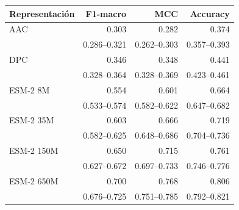 \begingroup\small\setlength{\tabcolsep}{3pt}
\begin{tabular}{lrrr}
\toprule
Representación & F1-macro & MCC & Accuracy \\
\midrule
AAC & 0.303 & 0.282 & 0.374 \\
 & {\scriptsize 0.286--0.321} & {\scriptsize 0.262--0.303} & {\scriptsize 0.357--0.393} \\
DPC & 0.346 & 0.348 & 0.441 \\
 & {\scriptsize 0.328--0.364} & {\scriptsize 0.328--0.369} & {\scriptsize 0.423--0.461} \\
ESM-2 8M & 0.554 & 0.601 & 0.664 \\
 & {\scriptsize 0.533--0.574} & {\scriptsize 0.582--0.622} & {\scriptsize 0.647--0.682} \\
ESM-2 35M & 0.603 & 0.666 & 0.719 \\
 & {\scriptsize 0.582--0.625} & {\scriptsize 0.648--0.686} & {\scriptsize 0.704--0.736} \\
ESM-2 150M & 0.650 & 0.715 & 0.761 \\
 & {\scriptsize 0.627--0.672} & {\scriptsize 0.697--0.733} & {\scriptsize 0.746--0.776} \\
ESM-2 650M & 0.700 & 0.768 & 0.806 \\
 & {\scriptsize 0.676--0.725} & {\scriptsize 0.751--0.785} & {\scriptsize 0.792--0.821} \\
\bottomrule
\end{tabular}
\endgroup
